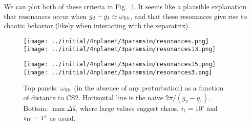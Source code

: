 \documentclass[11pt,
        usenames, %
        dvipsnames %
    ]{article}
\newcommand*{\bm}[1]{\boldsymbol{\mathbf{#1}}}
\newcommand*{\uv}[1]{\hat{\bm{#1}}}
\newcommand*{\p}[1]{\left(#1\right)}
\begin{document}
We can plot both of these criteria in Fig.~\ref{fig:resonances}. It seems like a
plausible explanation that resonances occur when $g_2 - g_1 \simeq \omega_{\rm
lib}$, and that these resonances give rise to chaotic behavior (likely when
interacting with the separatrix).
\begin{figure}
    \centering
    \texttt{[image: ../initial/4nplanet/3paramsim/resonances.png]}
    \texttt{[image: ../initial/4nplanet/3paramsim/resonances13.png]}

    \texttt{[image: ../initial/4nplanet/3paramsim/resonances15.png]}
    \texttt{[image: ../initial/4nplanet/3paramsim/resonances3.png]}
    \caption{Top panels: $\omega_{\rm lib}$ (in the absence of any perturbation)
    as a function of distance to CS2. Horizontal line is the naive $2\pi /
    \p{g_2 - g_1}$. Bottom: $\max \Delta \uv{s}$, where large values suggest
    chaos. $i_1 = 10^\circ$ and $i_{\rm 1f} = 1^\circ$ as usual.}\label{fig:resonances}
\end{figure}
\end{document}
